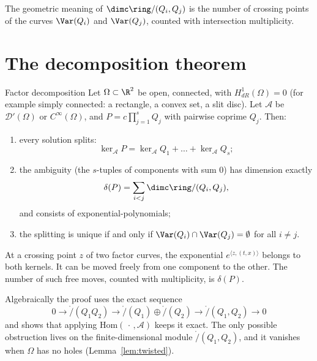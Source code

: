 The geometric meaning of $\dimc\ring/(Q_i,Q_j)$ is the number of crossing points of the curves $\Var(Q_i)$ and $\Var(Q_j)$, counted with intersection multiplicity.

\section{The decomposition theorem}

\begin{theorem}{Factor decomposition  \proved}\label{thm:factor}
Let $\Omega\subset\R^2$ be open, connected, with $H^1_{dR}(\Omega)=0$ (for example simply connected: a rectangle, a convex set, a slit disc). Let $\mathcal A$ be $\mathcal D'(\Omega)$ or $C^\infty(\Omega)$, and $P=c\prod_{j=1}^sQ_j$ with pairwise coprime $Q_j$. Then:
\begin{enumerate}[label=(\roman*)]
\item every solution splits:
\[
\ker_{\mathcal A}P=\ker_{\mathcal A}Q_1+\dots+\ker_{\mathcal A}Q_s ;
\]
\item the ambiguity (the $s$-tuples of components with sum $0$) has dimension exactly
\[
\delta(P)=\sum_{i<j}\dimc\ring/(Q_i,Q_j),
\]
and consists of exponential-polynomials;
\item the splitting is unique if and only if $\Var(Q_i)\cap\Var(Q_j)=\emptyset$ for all $i\ne j$.
\end{enumerate}
\end{theorem}

\begin{intuition}
At a crossing point $z$ of two factor curves, the exponential $e^{\langle z,(t,x)\rangle}$ belongs to both kernels. It can be moved freely from one component to the other. The number of such free moves, counted with multiplicity, is $\delta(P)$.

Algebraically the proof uses the exact sequence
\[
0\to\ring/(Q_1Q_2)\to\ring/(Q_1)\oplus\ring/(Q_2)\to\ring/(Q_1,Q_2)\to0
\]
and shows that applying $\mathrm{Hom}(\,\cdot\,,\mathcal A)$ keeps it exact. The only possible obstruction lives on the finite-dimensional module $\ring/(Q_1,Q_2)$, and it vanishes when $\Omega$ has no holes (Lemma~\ref{lem:twisted}).
\end{intuition}

